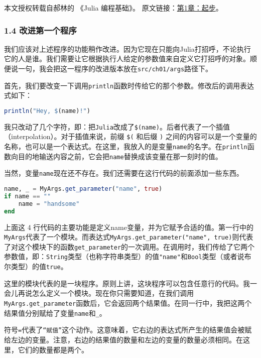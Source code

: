 
本文授权转载自郝林的 《Julia 编程基础》。 原文链接：\href{https://github.com/hyper0x/JuliaBasics/blob/master/book/ch01.md}{第1章：起步}。


\subsubsection{1.4 改进第一个程序}

我们应该对上述程序的功能稍作改进。因为它现在只能向Julia打招呼，不论执行它的人是谁。我们需要让它根据执行人给定的参数值来自定义它打招呼的对象。顺便说一句，我会把这一程序的改进版本放在\verb`src/ch01/args`路径下。

首先，我们要改变一下调用\verb`println`函数时传给它的那个参数。修改后的调用表达式如下：
\begin{lstlisting}[language=julia]
println("Hey, $(name)!")
\end{lstlisting}

我只改动了几个字符，即：把\verb`Julia`改成了\verb`$(name)`。后者代表了一个插值（interpolation）。对于插值来说，前缀 \verb`$(` 和后缀 \verb`)` 之间的内容可以是一个变量的名称，也可以是一个表达式。在这里，我放入的是变量\verb`name`的名字。在\verb`println`函数向目的地输送内容之前，它会把\verb`name`替换成该变量在那一刻时的值。

当然，变量\verb`name`现在还不存在。我们还需要在这行代码的前面添加一些东西。

\begin{lstlisting}[language=julia]
name, _ = MyArgs.get_parameter("name", true)
if name == "" 
    name = "handsome" 
end
\end{lstlisting}

上面这 4 行代码的主要功能是定义name变量，并为它赋予合适的值。第一行中的\verb`MyArgs`代表了一个模块。而表达式\verb`MyArgs.get_parameter("name", true)`则代表了对这个模块下的函数\verb`get_parameter`的一次调用。在调用时，我们传给了它两个参数值，即：\verb`String`类型（也称字符串类型）的值\verb`"name"`和\verb`Bool`类型（或者说布尔类型）的值\verb`true`。

这里的模块代表的是一块程序。原则上讲，这块程序可以包含任意行的代码。我一会儿再说怎么定义一个模块。现在你只需要知道，在我们调用\verb`MyArgs.get_parameter`函数后，它会返回两个结果值。在同一行中，我把这两个结果值分别赋给了变量\verb`name`和\verb`_`。

符号\verb`=`代表了\verb`“赋值”`这个动作。这意味着，它右边的表达式所产生的结果值会被赋给左边的变量。注意，右边的结果值的数量和左边的变量的数量必须相同。在这里，它们的数量都是两个。

